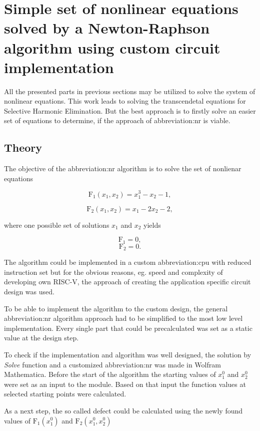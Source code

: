 \documentclass[a4paper, twoside, 11pt]{article}
\begin{document}
\section{Simple set of nonlinear equations solved by a Newton-Raphson algorithm using custom circuit implementation}
    All the presented parts in previous sections may be utilized to solve the system of nonlinear equations. This work leads to solving the transcendetal equations for Selective Harmonic Elimination. But the best approach is to firstly solve an easier set of equations to determine, if the approach of \gls{abbreviation:nr} is viable.
    \subsection{Theory}
        The objective of the \gls{abbreviation:nr} algorithm is to solve the set of nonlienar equations


        \begin{equation}
            \text{F}_1 (x_1, x_2) = x_1^3 - x_2 - 1, 
        \end{equation}

        \begin{equation}
            \text{F}_2 (x_1, x_2) = x_1 - 2 x_2 - 2, 
        \end{equation}

        where one possible set of solutions $x_1$ and $x_2$ yields

        \begin{equation}
            \text{F}_1 = 0, 
        \end{equation}
        \begin{equation}
            \text{F}_2 = 0.
        \end{equation}

        \par
        The algorithm could be implemented in a custom \gls{abbreviation:cpu} with reduced instruction set but for the obvious reasons, eg. speed and complexity of developing own RISC-V, the approach of creating the application specific circuit design was used.\par
        To be able to implement the algorithm to the custom design, the general \gls{abbreviation:nr} algorithm approach had to be simplified to the most low level implementation. Every single part that could be precalculated was set as a static value at the design step.\par
        To check if the implementation and algorithm was well designed, the solution by \textit{Solve} function and a customized \gls{abbreviation:nr} was made in Wolfram Mathematica. Before the start of the algorithm the starting values of $x_1^0$ and $x_2^0$ were set as an input to the module. Based on that input the function values at selected starting points were calculated.\par
        As a next step, the so called defect could be calculated using the newly found values of $\text{F}_1 (x_1^0)$ and $\text{F}_2 (x_1^0, x_2^0)$
\end{document}

